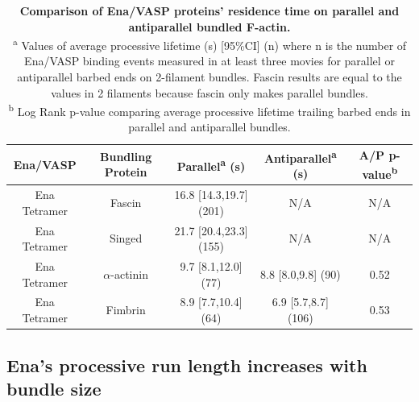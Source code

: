 \begin{table}
\centering
\begin{tabular}{ c c c c c }
\toprule 
Ena\slash VASP & Bundling Protein & Parallel\textsuperscript{a} (s) & Antiparallel\textsuperscript{a} (s) & A/P p-value\textsuperscript{b} \\
\midrule
Ena Tetramer & Fascin & 16.8 [14.3,19.7] (201) & N/A & N/A \\
Ena Tetramer & Singed & 21.7 [20.4,23.3] (155) & N/A & N/A \\
Ena Tetramer & $\alpha$-actinin & 9.7 [8.1,12.0] (77) & 8.8 [8.0,9.8] (90) & 0.52 \\
Ena Tetramer & Fimbrin & 8.9 [7.7,10.4] (64) & 6.9 [5.7,8.7] (106) & 0.53 \\
\bottomrule
\end{tabular}
\caption[Comparison of Ena/VASP proteins' residence time on parallel and antiparallel bundled F-actin.]{\textbf{Comparison of Ena/VASP proteins' residence time on parallel and antiparallel bundled F-actin.} \\
\textsuperscript{a} Values of average processive lifetime (s) [95\%CI] (n) where n is the number of Ena/VASP binding events measured in at least three movies for parallel or antiparallel barbed ends on 2-filament bundles. Fascin results are equal to the values in 2 filaments because fascin only makes parallel bundles. \\
\textsuperscript{b} Log Rank p-value comparing average processive lifetime trailing barbed ends in parallel and antiparallel bundles.
}
\label{tab:ena-parallel}
\end{table}

\subsection{Ena's processive run length increases with bundle size}\label{ena-bundle-size}

